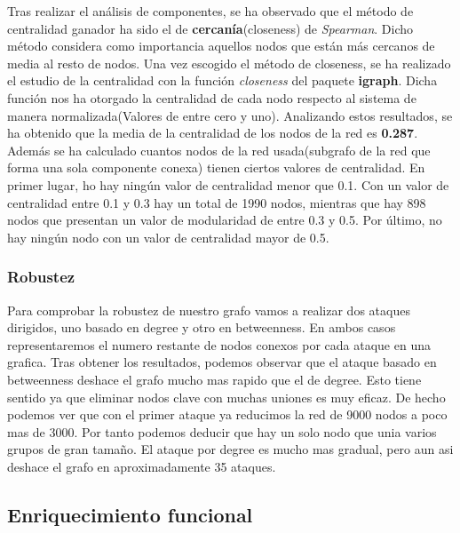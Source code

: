 Tras realizar el an\'alisis de componentes, se ha observado que el m\'etodo de centralidad ganador ha sido el de \textbf{cercan\'ia}(closeness) de \textit{Spearman}. Dicho método considera como importancia aquellos nodos que están más cercanos de media al resto de nodos.
Una vez escogido el m\'etodo de closeness, se ha realizado el estudio de la centralidad con la funci\'on \textit{closeness} del paquete \textbf{igraph}. Dicha funci\'on nos ha otorgado la centralidad de cada nodo respecto al sistema de manera normalizada(Valores de entre cero y uno).
Analizando estos resultados, se ha obtenido que la media de la centralidad de los nodos de la red es \textbf{0.287}.
Adem\'as se ha calculado cuantos nodos de la red usada(subgrafo de la red que forma una sola componente conexa) tienen ciertos valores de centralidad.
En primer lugar, ho hay ningún valor de centralidad menor que 0.1. Con un valor de centralidad entre 0.1 y 0.3 hay un total de 1990 nodos, mientras que hay 898 nodos que presentan un valor de modularidad de entre 0.3 y 0.5. Por último, no hay ningún nodo con un valor de centralidad mayor de 0.5.


\subsubsection{Robustez}

Para comprobar la robustez de nuestro grafo vamos a realizar dos ataques dirigidos, uno basado en degree y otro en betweenness. En ambos casos representaremos el numero restante de nodos conexos por cada ataque en una grafica. Tras obtener los resultados, podemos observar que el ataque basado en betweenness deshace el grafo mucho mas rapido que el de degree. Esto tiene sentido ya que eliminar nodos clave con muchas uniones es muy eficaz. De hecho podemos ver que con el primer ataque ya reducimos la red de 9000 nodos a poco mas de 3000. Por tanto podemos deducir que hay un solo nodo que unia varios grupos de gran tamaño.
El ataque por degree es mucho mas gradual, pero aun asi deshace el grafo en aproximadamente 35 ataques.

\subsection{Enriquecimiento funcional}

